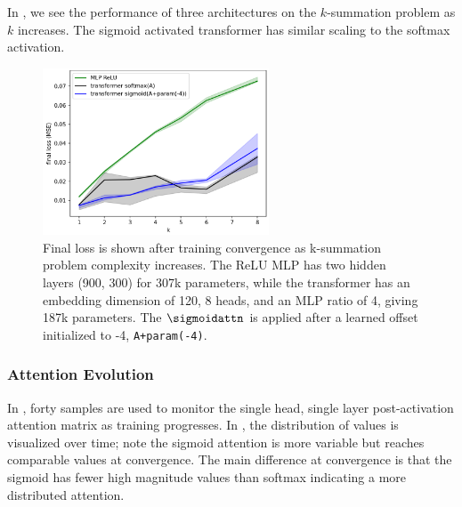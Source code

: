 In , we see the performance of three architectures on the $k$-summation problem as $k$ increases.  The sigmoid activated transformer has similar scaling to the softmax activation.

\begin{figure}[h]
    \centering
    \includegraphics[width=0.6\textwidth]{figures/final_loss_vs_k_summation.png}
    \caption{Final loss is shown after training convergence as k-summation problem complexity increases. The ReLU MLP has two hidden layers (900, 300) for 307k parameters, while the transformer has an embedding dimension of 120, 8 heads, and an MLP ratio of 4, giving 187k parameters. The $\sigmoidattn$ is applied after a learned offset initialized to -4, \texttt{A+param(-4)}.}
    \label{fig:final_loss_k_summation}
\end{figure}

\subsubsection{Attention Evolution}
\label{sec:a_se_evo}

In , forty samples are used to monitor the single head, single layer post-activation attention matrix as training progresses.   In , the distribution of values is visualized over time; note the sigmoid attention is more variable but reaches comparable values at convergence.  The main difference at convergence is that the sigmoid has fewer high magnitude values than softmax indicating a more distributed attention.  

